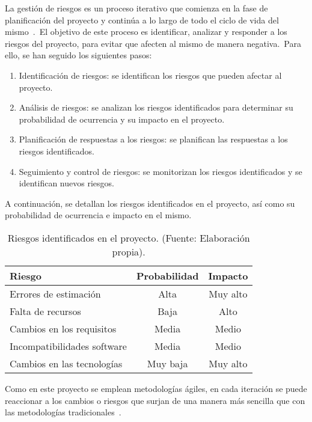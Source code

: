 
La gestión de riesgos es un proceso iterativo que comienza en la fase de planificación del proyecto y continúa a lo
largo de todo el ciclo de vida del mismo~\cite{riesgos_agile}.\ El objetivo de este proceso es identificar, analizar
y responder a los riesgos del proyecto, para evitar que afecten al mismo de manera negativa.\ Para ello, se han seguido
los siguientes pasos:

\begin{enumerate}
	\item Identificación de riesgos: se identifican los riesgos que pueden afectar al proyecto.
	\item Análisis de riesgos: se analizan los riesgos identificados para determinar su probabilidad de ocurrencia y su
	impacto en el proyecto.
	\item Planificación de respuestas a los riesgos: se planifican las respuestas a los riesgos identificados.
	\item Seguimiento y control de riesgos: se monitorizan los riesgos identificados y se identifican nuevos riesgos.
\end{enumerate}
\label{itm:riesgos_pasos}

A continuación, se detallan los riesgos identificados en el proyecto, así como su probabilidad de ocurrencia e impacto
en el mismo.

\begin{table}[H]
	\centering
	\caption{Riesgos identificados en el proyecto. (Fuente: Elaboración propia).}
	\begin{tabular}{lcc}
		\toprule
		\textbf{Riesgo}           & \textbf{Probabilidad} & \textbf{Impacto} \\
		\midrule
		Errores de estimación       & Alta                  & Muy alto         \\
		Falta de recursos           & Baja                  & Alto             \\
		Cambios en los requisitos   & Media                 & Medio            \\
		Incompatibilidades software & Media                 & Medio            \\
		Cambios en las tecnologías  & Muy baja              & Muy alto         \\
		\bottomrule
	\end{tabular}
	\label{tab:riesgos_identificados}
\end{table}

Como en este proyecto se emplean metodologías ágiles, en cada iteración se puede reaccionar a los cambios o riesgos
que surjan de una manera más sencilla que con las metodologías tradicionales~\cite{Lagestion42:online}.

